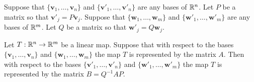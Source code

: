 \documentclass[10pt, a4paper]{article}
\newcommand{\mbf}[1]{\mathbf{#1}}
\begin{document}
\begin{corollary}
    Suppose that $\{\mbf{v}_1, \dotsc, \mbf{v}_n\}$ and $\{\mbf{v}'_1, \dotsc, \mbf{v}'_n\}$ are any bases of $\mathbb{R} ^ n$.
    Let $P$ be a matrix so that $\mbf{v}'_j = P\mbf{v}_j$.
    Suppose that $\{\mbf{w}_1, \dotsc, \mbf{w}_m\}$ and $\{\mbf{w}'_1, \dotsc, \mbf{w}'_m\}$ are any bases of $\mathbb{R} ^ m$.
    Let $Q$ be a matrix so that $\mbf{w}'_j = Q\mbf{w}_j$.

    Let $T : \mathbb{R} ^ n \rightarrow \mathbb{R} ^ m$ be a linear map.
    Suppose that with respect to the bases $\{\mbf{v}_1, \dotsc, \mbf{v}_n\}$ and $\{\mbf{w}_1, \dotsc, \mbf{w}_m\}$ the map $T$ is represented by the matrix $A$.
    Then with respect to the bases $\{\mbf{v}'_1, \dotsc, \mbf{v}'_n\}$ and $\{\mbf{w}'_1, \dotsc, \mbf{w}'_m\}$ the map $T$ is represented by the matrix $B = Q ^ {-1}AP$.
\end{corollary}
\end{document}
